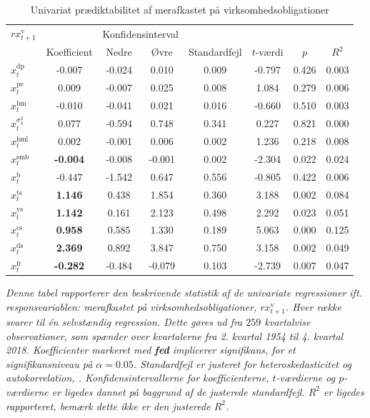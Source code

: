 \documentclass[
  a4paper,
  oneside]{memoir}
\begin{document}
\begin{table}[H]
\caption{\label{tab:UNI-v}Univariat prædiktabilitet af merafkastet på virksomhedsobligationer}
\centering
\begin{threeparttable}
\begin{tabular}[t]{lccccccc}
\toprule
\multicolumn{1}{c}{$rx_{t+1}^{\text{v}}$} & \multicolumn{1}{c}{ } & \multicolumn{2}{c}{Konfidensinterval} & \multicolumn{4}{c}{ } \\
\cmidrule(l{3pt}r{3pt}){1-1} \cmidrule(l{3pt}r{3pt}){3-4}
  & Koefficient & Nedre & Øvre & Standardfejl & $t$-værdi & $p$ & $R^2$\\
\midrule
\rowcolor{gray!6}  $x_t^{\text{dp}}$ & -0.007 & -0.024 & 0.010 & 0.009 & -0.797 & 0.426 & 0.003\\
$x_t^{\text{pe}}$ & 0.009 & -0.007 & 0.025 & 0.008 & 1.084 & 0.279 & 0.006\\
\rowcolor{gray!6}  $x_t^{\text{bm}}$ & -0.010 & -0.041 & 0.021 & 0.016 & -0.660 & 0.510 & 0.003\\
$x_t^{\sigma_{\text{a}}^2}$ & 0.077 & -0.594 & 0.748 & 0.341 & 0.227 & 0.821 & 0.000\\
\rowcolor{gray!6}  $x_t^{\text{hml}}$ & 0.002 & -0.001 & 0.006 & 0.002 & 1.236 & 0.218 & 0.008\\
$x_t^{\text{smb}}$ & \textbf{-0.004} & -0.008 & -0.001 & 0.002 & -2.304 & 0.022 & 0.024\\
\rowcolor{gray!6}  $x_t^{\text{b}}$ & -0.447 & -1.542 & 0.647 & 0.556 & -0.805 & 0.422 & 0.006\\
$x_t^{\text{ts}}$ & \textbf{ 1.146} & 0.438 & 1.854 & 0.360 & 3.188 & 0.002 & 0.084\\
\rowcolor{gray!6}  $x_t^{\text{ys}}$ & \textbf{ 1.142} & 0.161 & 2.123 & 0.498 & 2.292 & 0.023 & 0.051\\
$x_t^{\text{cs}}$ & \textbf{ 0.958} & 0.585 & 1.330 & 0.189 & 5.063 & 0.000 & 0.125\\
\rowcolor{gray!6}  $x_t^{\text{ds}}$ & \textbf{ 2.369} & 0.892 & 3.847 & 0.750 & 3.158 & 0.002 & 0.049\\
$x_t^{\text{fr}}$ & \textbf{-0.282} & -0.484 & -0.079 & 0.103 & -2.739 & 0.007 & 0.047\\
\bottomrule
\end{tabular}
\begin{tablenotes}
\item \textit{Denne tabel rapporterer den beskrivende statistik af de univariate regressioner ift. responsvariablen: merafkastet på virksomhedsobligationer, $rx_{t+1}^{\text{v}}$. Hver række svarer til én selvstændig regression. Dette gøres ud fra $259$ kvartalvise observationer, som spænder over kvartalerne fra 2. kvartal 1954 til 4. kvartal 2018. Koefficienter markeret med \textbf{fed} implicerer signifikans, for et signifikansniveau på $\alpha=0.05$. Standardfejl er justeret for heteroskedasticitet og autokorrelation, \citep{Newey1987}. Konfidensintervallerne for koefficienterne, $t$-værdierne og $p$-værdierne er ligedes dannet på baggrund af de justerede standardfejl. $R^2$ er ligedes rapporteret, bemærk dette ikke er den justerede $R^2$.}
\end{tablenotes}
\end{threeparttable}
\end{table}
\end{document}
